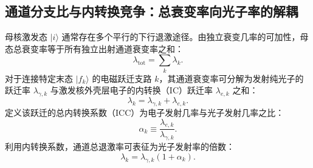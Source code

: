 \subsection{通道分支比与内转换竞争：总衰变率向光子率的解耦}\label{subsec:5-9-2}

母核激发态 $|i\rangle$ 通常存在多个平行的下行退激途径。由独立衰变几率的可加性，母态总衰变率等于所有独立出射通道衰变率之和：
\begin{equation}\label{eq:5-9-lambda-sum}
\lambda_{\text{tot}} = \sum_k \lambda_k.
\end{equation}
对于连接特定末态 $|f_k\rangle$ 的电磁跃迁支路 $k$，其通道衰变率可分解为发射纯光子的跃迁率 $\lambda_{\gamma, k}$ 与激发核外壳层电子的内转换（IC）跃迁率 $\lambda_{e, k}$ 之和：
\begin{equation}\label{eq:5-9-lambda-branch}
\lambda_k = \lambda_{\gamma, k} + \lambda_{e, k}.
\end{equation}
定义该跃迁的总内转换系数（ICC）为电子发射几率与光子发射几率之比：
\begin{equation}\label{eq:5-9-icc-def}
\alpha_k \equiv \frac{\lambda_{e, k}}{\lambda_{\gamma, k}}.
\end{equation}
利用内转换系数，通道总退激率可表征为光子发射率的倍数：
\begin{equation}\label{eq:5-9-lambda-k-icc}
\lambda_k = \lambda_{\gamma, k}(1 + \alpha_k).
\end{equation}


